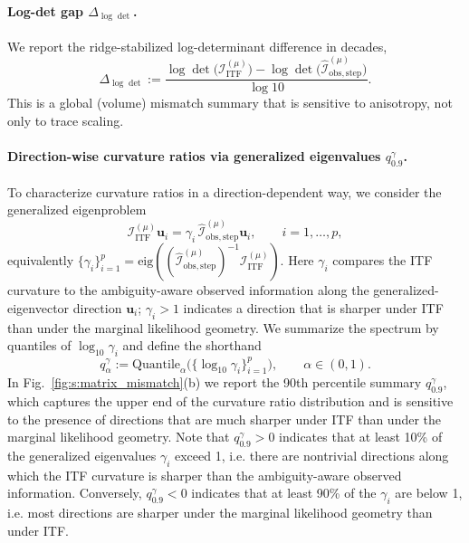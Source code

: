 \documentclass[twoside]{article}
\theoremstyle{plain}
\theoremstyle{definition}
\theoremstyle{remark}
\newcommand{\Iostephat}{\bm{\widehat{\mathcal{I}}}_{\mathrm{obs,step}}}
\begin{document}
\paragraph{Log-det gap $\Delta_{\log\det}$.}
We report the ridge-stabilized log-determinant difference in decades,
\begin{equation}
\Delta_{\log\det}
:=
\frac{\log\det\big(\bm{\mathcal I}_{\mathrm{ITF}}^{(\mu)}\big)-\log\det\big(\Iostephat^{(\mu)}\big)}{\log 10}.
\end{equation}
This is a global (volume) mismatch summary that is sensitive to anisotropy, not only to trace scaling.

\paragraph{Direction-wise curvature ratios via generalized eigenvalues $q_{0.9}^{\gamma}$.}
To characterize curvature ratios in a direction-dependent way, we consider the generalized eigenproblem
\begin{equation}
\label{eq:gen_eig}
\bm{\mathcal I}_{\mathrm{ITF}}^{(\mu)}\bm u_i = \gamma_i\,\Iostephat^{(\mu)}\bm u_i,
\qquad i=1,\dots,p,
\end{equation}
equivalently $\{\gamma_i\}_{i=1}^p=\mathrm{eig}((\Iostephat^{(\mu)})^{-1}\bm{\mathcal I}_{\mathrm{ITF}}^{(\mu)})$.
Here $\gamma_i$ compares the ITF curvature to the ambiguity-aware observed information along the generalized-eigenvector direction $\bm u_i$; $\gamma_i>1$ indicates a direction that is sharper under ITF than under the marginal likelihood geometry. We summarize the spectrum by quantiles of $\log_{10}\gamma_i$ and define the shorthand
\begin{equation}
q_{\alpha}^{\gamma}
:=
\mathrm{Quantile}_{\alpha}\!\big(\{\log_{10}\gamma_i\}_{i=1}^p\big),\qquad \alpha\in(0,1).
\end{equation}
In Fig.~\ref{fig:s:matrix_mismatch}(b) we report the 90th percentile summary $q_{0.9}^{\gamma}$, which captures the upper end of the curvature ratio distribution and is sensitive to the presence of directions that are much sharper under ITF than under the marginal likelihood geometry. Note that $q_{0.9}^{\gamma}>0$ indicates that at least 10\% of the generalized eigenvalues $\gamma_i$ exceed 1, i.e. there are nontrivial directions along which the ITF curvature is sharper than the ambiguity-aware observed information. Conversely, $q_{0.9}^{\gamma}<0$ indicates that at least 90\% of the $\gamma_i$ are below 1, i.e. most directions are sharper under the marginal likelihood geometry than under ITF.
\end{document}
